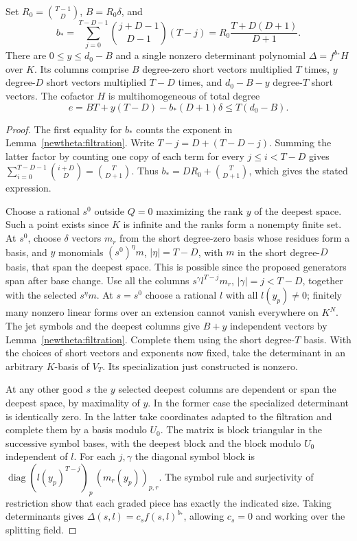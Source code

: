 \begin{lemma}\label{newtheta:power}
Set \(R_0=\binom{T-1}{D}\), \(B=R_0\delta\), and
\[
 b_*=\sum_{j=0}^{T-D-1}\binom{j+D-1}{D-1}(T-j)
     =R_0\frac{T+D(D+1)}{D+1}.
\]
There are \(0\le y\le d_0-B\) and a single nonzero determinant
polynomial \(\Delta=f^{b_*}H\) over \(K\). Its columns comprise
\(B\) degree-zero short vectors multiplied \(T\) times,
\(y\) degree-\(D\) short vectors multiplied \(T-D\) times,
and \(d_0-B-y\) degree-\(T\) short vectors. The cofactor \(H\)
is multihomogeneous of total degree
\[
 e=BT+y(T-D)-b_*(D+1)\delta\le T(d_0-B).
\]
\end{lemma}
\begin{proof}
The first equality for \(b_*\) counts the exponent in
Lemma~\ref{newtheta:filtration}. Write \(T-j=D+(T-D-j)\).
Summing the latter factor by counting one copy of each term for
every \(j\le i<T-D\) gives \(\sum_{i=0}^{T-D-1}\binom{i+D}{D}
=\binom{T}{D+1}\). Thus \(b_*=D R_0+\binom{T}{D+1}\),
which gives the stated expression.

Choose a rational \(s^0\) outside \(Q=0\) maximizing the rank \(y\)
of the deepest space. Such a point exists since \(K\) is infinite
and the ranks form a nonempty finite set. At \(s^0\), choose
\(\delta\) vectors \(m_r\) from the short degree-zero basis whose
residues form a basis, and \(y\) monomials \((s^0)^\eta m\),
\(|\eta|=T-D\), with \(m\) in the short degree-\(D\) basis,
that span the deepest space. This is possible since the proposed
generators span after base change. Use all the columns
\(s^\gamma l^{T-j}m_r\), \(|\gamma|=j<T-D\), together with
the selected \(s^\eta m\). At \(s=s^0\) choose a rational \(l\)
with all \(l(y_p)\ne0\); finitely many nonzero linear forms over
an extension cannot vanish everywhere on \(K^N\). The jet symbols
and the deepest columns give \(B+y\) independent vectors by
Lemma~\ref{newtheta:filtration}. Complete them using the short
degree-\(T\) basis. With the choices of short vectors and exponents
now fixed, take the determinant in an arbitrary \(K\)-basis of
\(V_T\). Its specialization just constructed is nonzero.

At any other good \(s\) the \(y\) selected deepest columns are
dependent or span the deepest space, by maximality of \(y\). In
the former case the specialized determinant is identically zero.
In the latter take coordinates adapted to the filtration and complete
them by a basis modulo \(U_0\). The matrix is block triangular in
the successive symbol bases, with the deepest block and the block
modulo \(U_0\) independent of \(l\). For each \(j,\gamma\) the
diagonal symbol block is
\(\operatorname{diag}(l(y_p)^{T-j})_{p}\,(m_r(y_p))_{p,r}\).
The symbol rule and surjectivity of restriction show that each graded
piece has exactly the indicated size. Taking determinants gives
\(\Delta(s,l)=c_s f(s,l)^{b_*}\), allowing \(c_s=0\) and working
over the splitting field.


\end{proof}
